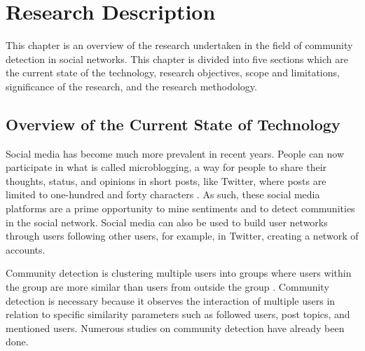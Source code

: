 %
%
%                 




\chapter{Research Description}
\label{sec:researchdesc}




This chapter is an overview of the research undertaken in the field of community detection in social networks. 
This chapter is divided into five sections which are the current state of the technology, research objectives, scope and limitations, significance of the research, and the research methodology.




\section{Overview of the Current State of Technology}
\label{sec:overview}


Social media has become much more prevalent in recent years. People can now participate in what is called microblogging, a way for people to share their thoughts, status, and opinions in short posts, like Twitter, where posts are limited to one-hundred and forty characters \cite{Java:2007}. As such, these social media platforms are a prime opportunity to mine sentiments and to detect communities in the social network. Social media can also be used to build user networks through users following other users, for example, in Twitter, creating a network of accounts.




Community detection is clustering multiple users into groups where users within the group are more similar than users from outside the group \cite{Tang:2010}. Community detection is necessary because it observes the interaction of multiple users in relation to specific similarity parameters such as followed users, post topics, and mentioned users. Numerous studies on community detection have already been done. 



